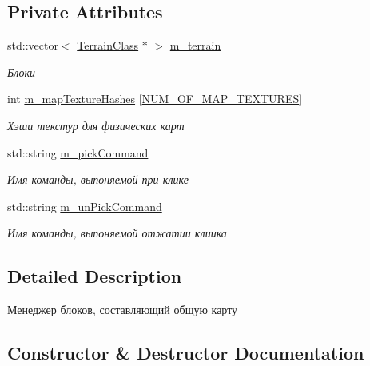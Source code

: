 \subsection*{Private Attributes}
\begin{DoxyCompactItemize}
\item 
std\+::vector$<$ \hyperlink{class_terrain_class}{Terrain\+Class} $\ast$ $>$ \hyperlink{class_terrain_manager_class_acd6b26be63b408bda9bdb89ee6fa55e7}{m\+\_\+terrain}
\begin{DoxyCompactList}\small\item\em Блоки \end{DoxyCompactList}\item 
int \hyperlink{class_terrain_manager_class_a0d44a18c1703cc7be820bb07fdaf12c0}{m\+\_\+map\+Texture\+Hashes} \mbox{[}\hyperlink{_terrain_shader_class_8h_a466908f00ce155fb671c61b15bdb1c6b}{N\+U\+M\+\_\+\+O\+F\+\_\+\+M\+A\+P\+\_\+\+T\+E\+X\+T\+U\+R\+ES}\mbox{]}
\begin{DoxyCompactList}\small\item\em Хэши текстур для физических карт \end{DoxyCompactList}\item 
std\+::string \hyperlink{class_terrain_manager_class_a971d659e8eb59f222f8d5ab6069f123c}{m\+\_\+pick\+Command}
\begin{DoxyCompactList}\small\item\em Имя команды, выпоняемой при клике \end{DoxyCompactList}\item 
std\+::string \hyperlink{class_terrain_manager_class_a2f66a9efc8a7c64362196272941fb078}{m\+\_\+un\+Pick\+Command}
\begin{DoxyCompactList}\small\item\em Имя команды, выпоняемой отжатии клиика \end{DoxyCompactList}\end{DoxyCompactItemize}


\subsection{Detailed Description}
Менеджер блоков, составляющий общую карту 

\subsection{Constructor \& Destructor Documentation}
\mbox{\label{class_terrain_manager_class_a0bfd7d768187733c4f91caa9244b5d4a}} 
